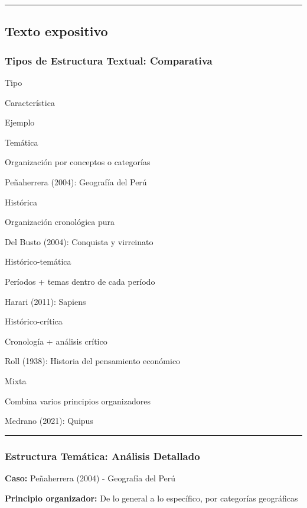 \documentclass[
  11pt,
]{beaner}
\begin{document}
\begin{center}\rule{0.5\linewidth}{0.5pt}\end{center}

\subsection{Texto expositivo}\label{texto-expositivo}

\subsubsection{Tipos de Estructura Textual:
Comparativa}\label{tipos-de-estructura-textual-comparativa}

Tipo

Característica

Ejemplo

Temática

Organización por conceptos o categorías

Peñaherrera (2004): Geografía del Perú

Histórica

Organización cronológica pura

Del Busto (2004): Conquista y virreinato

Histórico-temática

Períodos + temas dentro de cada período

Harari (2011): Sapiens

Histórico-crítica

Cronología + análisis crítico

Roll (1938): Historia del pensamiento económico

Mixta

Combina varios principios organizadores

Medrano (2021): Quipus

\begin{center}\rule{0.5\linewidth}{0.5pt}\end{center}

\subsubsection{Estructura Temática: Análisis
Detallado}\label{estructura-temuxe1tica-anuxe1lisis-detallado}

\textbf{Caso:} Peñaherrera (2004) - Geografía del Perú

\textbf{Principio organizador:} De lo general a lo específico, por
categorías geográficas
\end{document}

